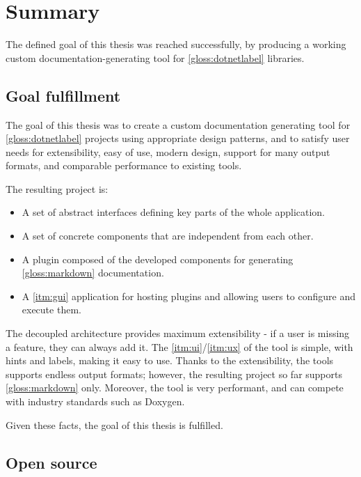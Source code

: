 \chapter*{Summary}

The defined goal of this thesis was reached successfully, by producing a working custom documentation-generating tool for \ref{gloss:dotnetlabel} libraries.

\section*{Goal fulfillment}

The goal of this thesis was to create a custom documentation generating tool for \ref{gloss:dotnetlabel} projects using appropriate design patterns, and to satisfy user needs for extensibility, easy of use, modern design, support for many output formats, and comparable performance to existing tools.

The resulting project is:
\begin{itemize}
    \item A set of abstract interfaces defining key parts of the whole application.
    \item A set of concrete components that are independent from each other.
    \item A plugin composed of the developed components for generating \ref{gloss:markdown} documentation.
    \item A \ref{itm:gui} application for hosting plugins and allowing users to configure and execute them.
\end{itemize}

The decoupled architecture provides maximum extensibility - if a user is missing a feature, they can always add it. The \ref{itm:ui}/\ref{itm:ux} of the tool is simple, with hints and labels, making it easy to use. Thanks to the extensibility, the tools supports endless output formats; however, the resulting project so far supports \ref{gloss:markdown} only. Moreover, the tool is very performant, and can compete with industry standards such as Doxygen.

Given these facts, the goal of this thesis is fulfilled.

\section*{Open source}


